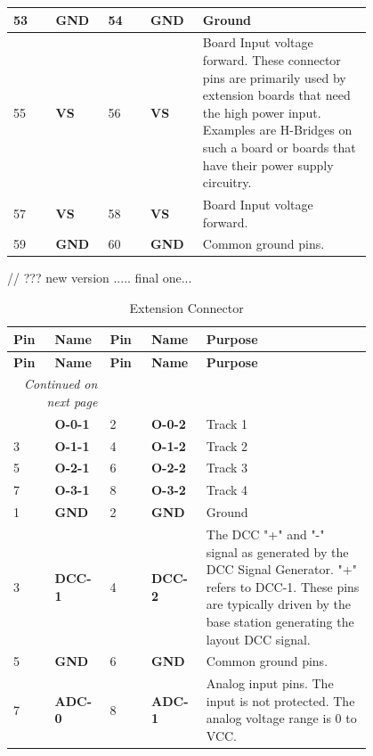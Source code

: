 \begin{longtable}{@{}|p{0.1\linewidth}|p{0.1\linewidth}|p{0.1\linewidth}|p{0.1\linewidth}|p{0.4\linewidth}|@{}}
    \midrule
    53 & \textbf{GND} & 54 & \textbf{GND} & Ground \\
    \midrule
    55 & \textbf{VS} & 56 & \textbf{VS} & Board Input voltage forward. These  connector pins are primarily used by extension boards that need the high power input. Examples  are H-Bridges on such a board or boards that have their power supply circuitry. \\
    \midrule
    57 & \textbf{VS} & 58 & \textbf{VS} & Board Input voltage forward. \\
    \midrule
    59 & \textbf{GND} & 60 & \textbf{GND} & Common ground pins. \\
    \midrule
\end{longtable}  

// ??? new version ..... final one...

\begin{longtable}{@{}|p{0.1\linewidth}|p{0.1\linewidth}|p{0.1\linewidth}|p{0.1\linewidth}|p{0.4\linewidth}|@{}}
    \caption{Extension Connector} \\
    \toprule
    \textbf{Pin} & \textbf{Name} & \textbf{Pin} & \textbf{Name} & \textbf{Purpose} \\
    \midrule
    \endfirsthead
    \toprule
    \textbf{Pin} & \textbf{Name} & \textbf{Pin} & \textbf{Name} & \textbf{Purpose} \\
    \midrule
    \endhead
    \midrule
    \multicolumn{2}{r}{\textit{Continued on next page}} \\
    \midrule
    \endfoot
    \bottomrule
    \endlastfoot
    1 & \textbf{O-0-1} & 2 & \textbf{O-0-2} & Track 1 \\
    \midrule
    3 & \textbf{O-1-1} & 4 & \textbf{O-1-2} & Track 2 \\
    \midrule
    5 & \textbf{O-2-1} & 6 & \textbf{O-2-2} & Track 3 \\
    \midrule
    7 & \textbf{O-3-1} & 8 & \textbf{O-3-2} & Track 4 \\
    \midrule
    \midrule
    \midrule
    1 & \textbf{GND} & 2 & \textbf{GND} & Ground \\
    \midrule
    3 & \textbf{DCC-1} & 4 & \textbf{DCC-2} & The DCC "+" and "-" signal as generated by the DCC Signal Generator. "+" refers to DCC-1. These pins are typically driven by the base station generating the layout DCC signal.\\
    \midrule
    5 & \textbf{GND} & 6 & \textbf{GND} & Common ground pins. \\
    \midrule
    7 & \textbf{ADC-0} & 8 & \textbf{ADC-1} & Analog input pins. The input is not protected. The analog voltage range is 0 to VCC. \\

\end{longtable}
